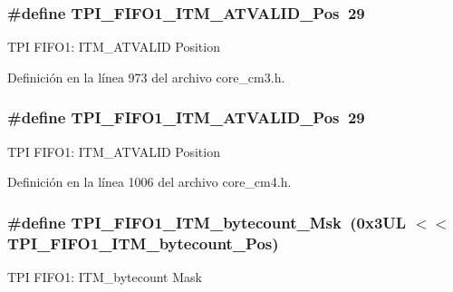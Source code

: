 \subsubsection[{\texorpdfstring{T\+P\+I\+\_\+\+F\+I\+F\+O1\+\_\+\+I\+T\+M\+\_\+\+A\+T\+V\+A\+L\+I\+D\+\_\+\+Pos}{TPI_FIFO1_ITM_ATVALID_Pos}}]{\setlength{\rightskip}{0pt plus 5cm}\#define T\+P\+I\+\_\+\+F\+I\+F\+O1\+\_\+\+I\+T\+M\+\_\+\+A\+T\+V\+A\+L\+I\+D\+\_\+\+Pos~29}\hypertarget{group___c_m_s_i_s___t_p_i_ga08edfc862b2c8c415854cc4ae2067dfb}{}\label{group___c_m_s_i_s___t_p_i_ga08edfc862b2c8c415854cc4ae2067dfb}
T\+PI F\+I\+F\+O1\+: I\+T\+M\+\_\+\+A\+T\+V\+A\+L\+ID Position 

Definición en la línea 973 del archivo core\+\_\+cm3.\+h.

\subsubsection[{\texorpdfstring{T\+P\+I\+\_\+\+F\+I\+F\+O1\+\_\+\+I\+T\+M\+\_\+\+A\+T\+V\+A\+L\+I\+D\+\_\+\+Pos}{TPI_FIFO1_ITM_ATVALID_Pos}}]{\setlength{\rightskip}{0pt plus 5cm}\#define T\+P\+I\+\_\+\+F\+I\+F\+O1\+\_\+\+I\+T\+M\+\_\+\+A\+T\+V\+A\+L\+I\+D\+\_\+\+Pos~29}\hypertarget{group___c_m_s_i_s___t_p_i_ga08edfc862b2c8c415854cc4ae2067dfb}{}\label{group___c_m_s_i_s___t_p_i_ga08edfc862b2c8c415854cc4ae2067dfb}
T\+PI F\+I\+F\+O1\+: I\+T\+M\+\_\+\+A\+T\+V\+A\+L\+ID Position 

Definición en la línea 1006 del archivo core\+\_\+cm4.\+h.

\subsubsection[{\texorpdfstring{T\+P\+I\+\_\+\+F\+I\+F\+O1\+\_\+\+I\+T\+M\+\_\+bytecount\+\_\+\+Msk}{TPI_FIFO1_ITM_bytecount_Msk}}]{\setlength{\rightskip}{0pt plus 5cm}\#define T\+P\+I\+\_\+\+F\+I\+F\+O1\+\_\+\+I\+T\+M\+\_\+bytecount\+\_\+\+Msk~(0x3\+U\+L $<$$<$ T\+P\+I\+\_\+\+F\+I\+F\+O1\+\_\+\+I\+T\+M\+\_\+bytecount\+\_\+\+Pos)}\hypertarget{group___c_m_s_i_s___t_p_i_gacba2edfc0499828019550141356b0dcb}{}\label{group___c_m_s_i_s___t_p_i_gacba2edfc0499828019550141356b0dcb}
T\+PI F\+I\+F\+O1\+: I\+T\+M\+\_\+bytecount Mask 

